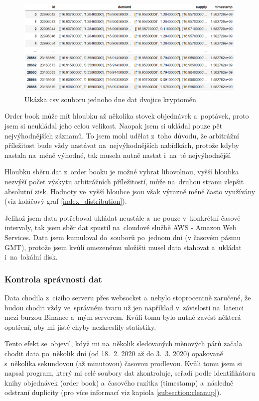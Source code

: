 \documentclass[thesis=B,czech]{FITthesis}[2019/03/21]
\begin{document}
\begin{figure}\centering
	\includegraphics[width=1\textwidth]{images/csv_data.PNG}
	\caption{Ukázka csv souboru jednoho dne dat dvojice kryptoměn}\label{csv_data}
\end{figure}
Order book může mít hloubku až několika stovek objednávek a~poptávek, proto jsem si neukládal jeho celou velikost. Naopak jsem si ukládal pouze pět nejvýhodnějších záznamů. To jsem mohl udělat z~toho důvodu, že arbitrážní příležitost bude vždy nastávat na~nejvýhodnějších nabídkách, protože kdyby nastala na~méně výhodné, tak musela nutně nastat i~na~té nejvýhodnější. 

Hloubku sběru dat z~order booku je možné vybrat libovolnou, vyšší hloubka nezvýší počet výskytu arbitrážních příležitostí, může na~druhou stranu zlepšit absolutní zisk. Hodnoty ve~vyšší hloubce jsou však výrazně méně často využívány (viz koláčový graf \ref{index_distribution}).

Jelikož jsem data potřeboval ukládat neustále a~ne pouze v~konkrétní časové intervaly, tak jsem sběr dat spustil na~cloudové službě AWS - Amazon Web Services. Data jsem kumuloval do~souborů po~jednom dni (v časovém pásmu GMT), protože jsem kvůli omezenému uložišti musel data stahovat a~ukládat i~na~lokální disk.

\subsubsection{Kontrola správnosti dat}
\label{section:kontrola_spravnosti_dat}
Data chodila z~cizího serveru přes websocket a~nebylo stoprocentně zaručené, že budou chodit vždy ve~správném tvaru už jen například v~závislosti na~latenci mezi burzou Binance a~mým serverem. Kvůli tomu bylo nutné zavést některá opatření, aby mi jisté chyby nezkreslily statistiky.

Tento efekt se~objevil, když mi na~několik sledovaných měnových párů začala chodit data po~několik dní (od 18.~2. 2020 až do 3.~3. 2020) opakovaně s~několika sekundovou (až minutovou) časovou prodlevou. Kvůli tomu jsem si napsal program, který mi celé soubory dat zkontroluje, seřadí podle identifikátoru knihy objednávek (order book) a~časového razítka (timestamp) a~následně odstraní duplicity (pro více informací viz kapiola \ref{subsection:cleanup}). 
\end{document}
